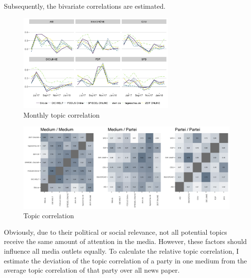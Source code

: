 \documentclass[12pt,a4paper,notitlepage]{article}
\begin{document}

Subsequently, the bivariate correlations are estimated. 

\begin{figure}[H]
	\caption{Monthly topic correlation}
	\begin{center}
		\includegraphics[width=0.7\textwidth]{../figs/corr_timeline}
	\end{center}
\end{figure}

\begin{figure}[H]
	\caption{Topic correlation}
	\begin{center}
		\includegraphics[width=\textwidth]{../figs/corrplot}
	\end{center}
\end{figure}


Obviously, due to their political or social relevance, not all potential topics receive the same amount of attention in the media. However, these factors should influence all media outlets equally. To calculate the relative topic correlation, I estimate the deviation of the topic correlation of a party in one medium from the average topic correlation of that party over all news paper.
\end{document}
